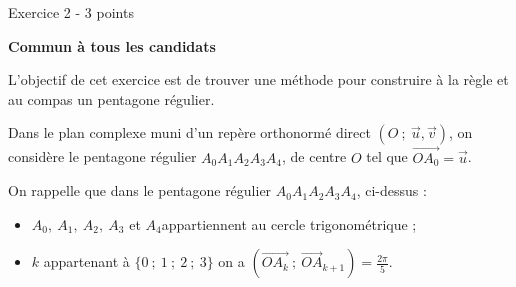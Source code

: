 
%
\begin{h2}Exercice 2 - 3 points\end{h2}
\par
\textbf{Commun  à tous les candidats}
\par
L'objectif de cet exercice est de trouver une méthode pour construire à la règle et au compas un pentagone régulier.
\par
Dans le plan complexe muni d'un repère orthonormé direct $(O~;~\vec{u},\vec{v})$, on considère le pentagone régulier $A_0A_1A_2A_3A_4$, de centre $O$ tel que $\overrightarrow{OA_0} = \vec{u}$.

\begin{center}
\end{center}
On rappelle que dans le pentagone régulier $A_0A_1A_2A_3A_4$, ci-dessus :
\begin{itemize}
     \item
     $A_0,\:A_1,\:A_2,\:A_3$ et $A_4$appartiennent au cercle trigonométrique ;\item
     $k$ appartenant à $\{0~;~1~;~2~;~3\}$ on a $\left(\overrightarrow{OA_k}~;~\overrightarrow{OA}_{k+1}\right) = \frac{2\pi}{5} $.
\end{itemize}
